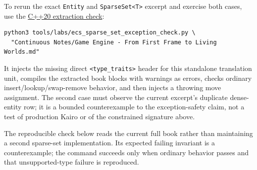 To rerun the exact \texttt{Entity} and \texttt{SparseSet\textless{}T\textgreater{}} excerpt and exercise both cases, use the \href{../../tools/labs/ecs_sparse_set_exception_check.py}{C++20 extraction check}:

\begin{verbatim}
python3 tools/labs/ecs_sparse_set_exception_check.py \
  "Continuous Notes/Game Engine - From First Frame to Living Worlds.md"
\end{verbatim}

It injects the missing direct \texttt{\textless{}type\_traits\textgreater{}} header for this standalone translation unit, compiles the extracted book blocks with warnings as errors, checks ordinary insert/lookup/swap-remove behavior, and then injects a throwing move assignment. The second case must observe the current excerpt's duplicate dense-entity row; it is a bounded counterexample to the exception-safety claim, not a test of production Kairo or of the constrained signature above.

The reproducible check below reads the current full book rather than maintaining a second sparse-set implementation. Its expected failing invariant is a counterexample; the command succeeds only when ordinary behavior passes and that unsupported-type failure is reproduced.

